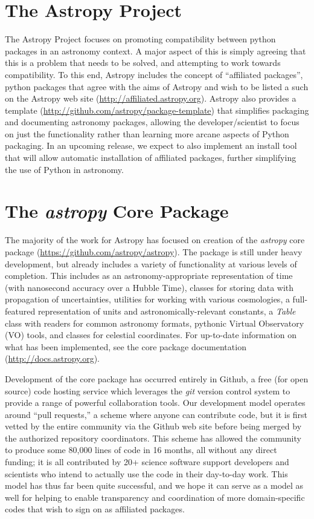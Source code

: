 \section{The Astropy Project}
The Astropy Project focuses on promoting compatibility between python packages in an astronomy context.  A major aspect of this is simply agreeing that this is a problem that needs to be solved, and attempting to work towards compatibility.  To this end, Astropy includes the concept of ``affiliated packages'', python packages that agree with the aims of Astropy and wish to be listed a such on the Astropy web site (\url{http://affiliated.astropy.org}).  Astropy also provides a template (\url{http://github.com/astropy/package-template}) that simplifies packaging and documenting astronomy packages, allowing the developer/scientist to focus on just the functionality rather than learning more arcane aspects of Python packaging.  In an upcoming release, we expect to also implement an install tool that will allow automatic installation of affiliated packages, further simplifying the use of Python in astronomy.

\section{The {\it astropy} Core Package} 
The majority of the work for Astropy has focused on creation of the {\it astropy} core package (\url{https://github.com/astropy/astropy}).  The package is still under heavy development, but already includes a variety of functionality at various levels of completion.  This includes as an astronomy-appropriate representation of time (with nanosecond accuracy over a Hubble Time), classes for storing data with propagation of uncertainties, utilities for working with various cosmologies, a full-featured representation of units and astronomically-relevant constants, a {\it Table} class with readers for common astronomy formats, pythonic Virtual Observatory (VO) tools, and classes for celestial coordinates.  For up-to-date information on what has been implemented, see the core package documentation (\url{http://docs.astropy.org}).

Development of the core package has occurred entirely in Github, a free (for open source) code hosting service which leverages the {\it git} version control system to provide a range of powerful collaboration tools.  Our development model operates around ``pull requests,'' a scheme where anyone can contribute code, but it is first vetted by the entire community via the Github web site before being merged by the authorized repository coordinators. This scheme has allowed the community to produce some 80,000 lines of code in 16 months, all without any direct funding; it is all contributed by 20+  science software support developers and scientists who intend to actually use the code in their day-to-day work.  This model has thus far been quite successful, and we hope it can serve as a model as well for helping to enable transparency and coordination of more domain-specific codes that wish to sign on as affiliated packages.

